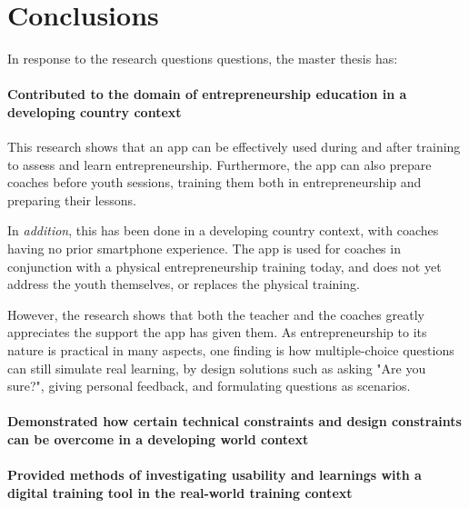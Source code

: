\chapter{Conclusions}\label{cha:conclusion}


In response to the research questions questions, the master thesis has: %

\subsubsection{Contributed to the domain of entrepreneurship education in a developing country context}
This research shows that an app can be effectively used during and after training to assess and learn entrepreneurship. Furthermore, the app can also prepare coaches before youth sessions, training them both in entrepreneurship and preparing their lessons.

In \textit{addition}, this has been done in a developing country context, with coaches having no prior smartphone experience. The app is used for coaches in conjunction with a physical entrepreneurship training today, and does not yet address the youth themselves, or replaces the physical training.

However, the research shows that both the teacher and the coaches greatly appreciates the support the app has given them. As entrepreneurship to its nature is practical in many aspects, one finding is how multiple-choice questions can still simulate real learning, by design solutions such as asking "Are you sure?", giving personal feedback, and formulating questions as scenarios.

\subsubsection{Demonstrated how certain technical constraints and design constraints can be overcome in a developing world context} %


\subsubsection{Provided methods of investigating usability and learnings with a digital training tool in the real-world training context} %

